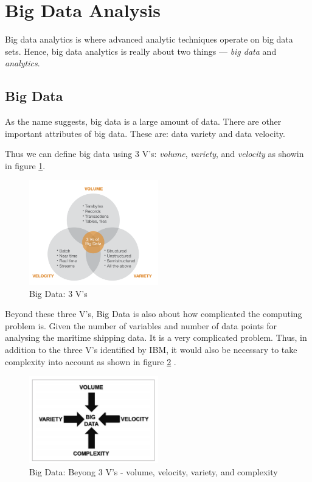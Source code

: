 \section{Big Data Analysis}

Big data analytics is where advanced analytic techniques operate on big data sets. Hence, big data
analytics is really about two things — \textit{big data} and \textit{analytics}.



\subsection{Big Data}

As the name suggests, big data is a large amount of data. There are other important attributes of big data. These are:  data variety and data velocity.

Thus we can define big data using 3 V's: \textit{volume}, \textit{variety}, and \textit{velocity} as showin in figure \ref*{bigData}.

\begin{figure}[h]
    \centering
    \includegraphics[width=0.5\textwidth]{images/big_data.png}
    \caption{Big Data: 3 V's \autocite{3vbigdata}}
    \label{bigData}
\end{figure}

Beyond these three V's, Big Data is also about how complicated the computing
problem is. Given the number of variables and number of data points for analysing the maritime shipping data. It is a very complicated problem.
Thus, in addition to the three V's identified by IBM, it would also be necessary to take complexity into account as shown in figure \ref*{bigDataComplex} \autocite{pence2014big}.

\begin{figure}[h]
    \centering
    \includegraphics[width=0.5\textwidth]{images/big_data_complex.png}
    \caption{Big Data: Beyong 3 V's - volume, velocity,
        variety, and complexity}
    \label{bigDataComplex}
\end{figure}


